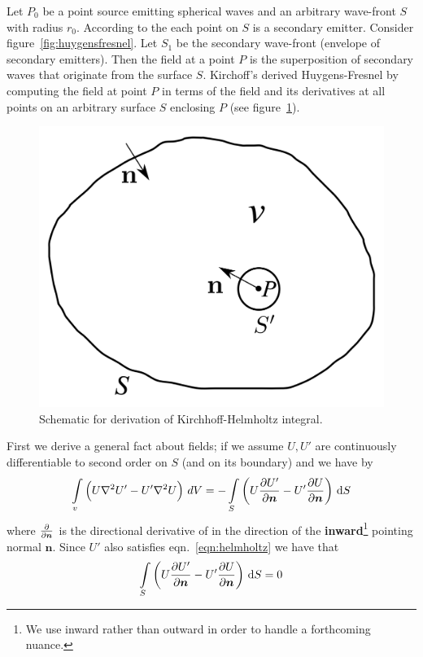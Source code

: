 Let \(P_0\) be a point source emitting spherical waves and an arbitrary wave-front \(S\) with radius \(r_0\).
%
According to the  each point on \(S\) is a secondary emitter.
%
Consider figure~\ref{fig:huygensfresnel}. Let \(S_1\) be the secondary wave-front (envelope of secondary emitters).
%
Then the field at a point \(P\) is the superposition of secondary waves that originate from the surface \(S\).
%
Kirchoff's derived Huygens-Fresnel by computing the field at point \(P\) in terms of the field
and its derivatives at all points on an arbitrary surface \(S\) enclosing \(P\) (see figure~\ref{fig:kirchoff}).
%
\begin{figure}
    \includegraphics[width=\linewidth]{figures/appendix/kirchoff.png}
    \caption{Schematic for derivation of Kirchhoff-Helmholtz integral.}\label{fig:kirchoff}
\end{figure}

First we derive a general fact about fields; if we assume \(U, U'\) are continuously differentiable to second order on \(S\) (and on its boundary) and we have by 
%
\begin{equation*}
    \int\limits_{v}\left(U \nabla^2 U' - U' \nabla^2 U \right)\,dV= - \int\limits_{S}\left(U \pdv{U'}{\bm{n}}- U'  \pdv{U}{\bm{n}}\right)\,\dif S
\end{equation*}
%
where \(\pdv{}{\bm{n}}\) is the directional derivative of in the direction of the \textbf{inward}\footnote{We use inward rather than outward in order to handle a forthcoming nuance.} pointing normal \(\bm{n}\).
%
Since \(U'\) also satisfies eqn.~\eqref{eqn:helmholtz} we have that
%
\begin{equation}
    \int\limits_{S}\left(U \pdv{U'}{\bm{n}} - U'  \pdv{U}{\bm{n}}\right)\,\dif S = 0
    \label{eqn:greenssimple}
\end{equation}

